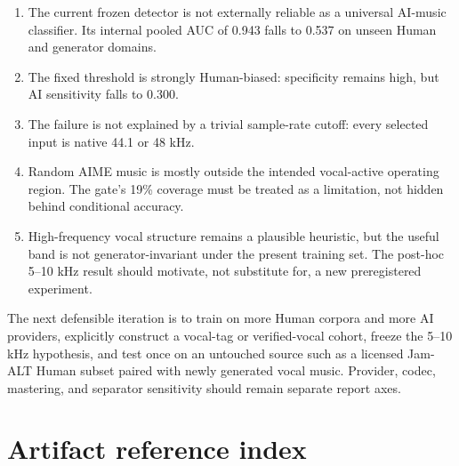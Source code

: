\documentclass[11pt,a4paper]{article}
\begin{document}
\begin{enumerate}
  \item The current frozen detector is not externally reliable as a universal AI-music classifier. Its internal pooled AUC of 0.943 falls to 0.537 on unseen Human and generator domains.
  \item The fixed threshold is strongly Human-biased: specificity remains high, but AI sensitivity falls to 0.300.
  \item The failure is not explained by a trivial sample-rate cutoff: every selected input is native 44.1 or 48 kHz.
  \item Random AIME music is mostly outside the intended vocal-active operating region. The gate's 19\% coverage must be treated as a limitation, not hidden behind conditional accuracy.
  \item High-frequency vocal structure remains a plausible heuristic, but the useful band is not generator-invariant under the present training set. The post-hoc 5--10 kHz result should motivate, not substitute for, a new preregistered experiment.
\end{enumerate}

The next defensible iteration is to train on more Human corpora and more AI providers, explicitly construct a vocal-tag or verified-vocal cohort, freeze the 5--10 kHz hypothesis, and test once on an untouched source such as a licensed Jam-ALT Human subset paired with newly generated vocal music. Provider, codec, mastering, and separator sensitivity should remain separate report axes.

\section{Artifact reference index}
\end{document}
